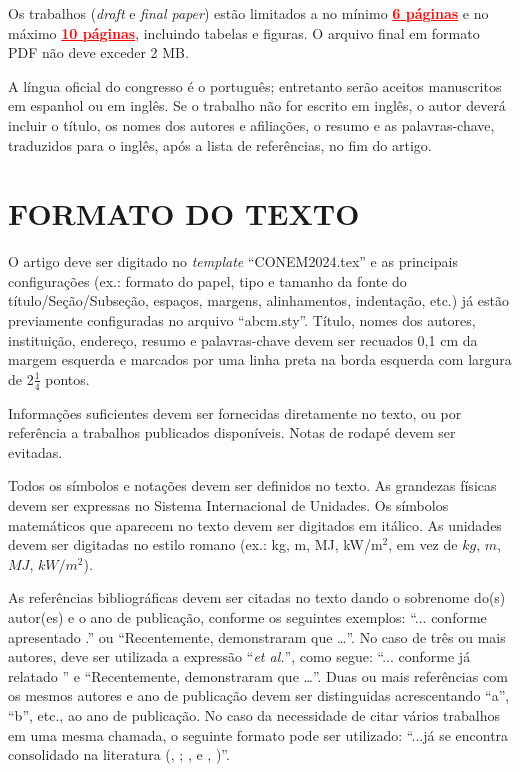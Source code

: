 \documentclass[10pt,fleqn,a4paper,twoside]{article}
\begin{document}
        Os trabalhos (\textit{draft} e \textit{final paper}) estão limitados a no mínimo \textcolor{red}{\underline{\textbf{6 páginas}}} e no máximo \textcolor{red}{\underline{\textbf{10 páginas}}}, incluindo tabelas e figuras. O arquivo final em formato PDF não deve exceder 2 MB.

        A língua oficial do congresso é o português; entretanto serão aceitos manuscritos em espanhol ou em inglês. Se o trabalho não for escrito em inglês, o autor deverá incluir o título, os nomes dos autores e afiliações, o resumo e as palavras-chave, traduzidos para o inglês, após a lista de referências, no fim do artigo.


    \section{FORMATO DO TEXTO}
        
        O artigo deve ser digitado no \textit{template} ``CONEM2024.tex'' e as principais configurações (ex.: formato do papel, tipo e tamanho da fonte do título/Seção/Subseção, espaços, margens, alinhamentos, indentação, etc.) já estão previamente configuradas no arquivo ``abcm.sty''. Título, nomes dos autores, instituição, endereço, resumo e palavras-chave devem ser recuados 0,1 cm da margem esquerda e marcados por uma linha preta na borda esquerda com largura de 2$\frac{1}{4}$ pontos.
        
        Informações suficientes devem ser fornecidas diretamente no texto, ou por referência a trabalhos publicados disponíveis. Notas de rodapé devem ser evitadas. 
        
        Todos os símbolos e notações devem ser definidos no texto. As grandezas físicas devem ser expressas no Sistema Internacional de Unidades. Os símbolos matemáticos que aparecem no texto devem ser digitados em itálico. As unidades devem ser digitadas no estilo romano (ex.: kg, m, MJ, kW/m$^2$, em vez de $kg$, $m$, $MJ$, $kW/m^2$).
        
        As referências bibliográficas devem ser citadas no texto dando o sobrenome do(s) autor(es) e o ano de publicação, conforme os seguintes exemplos: ``... conforme apresentado \citep{MinwooShamim13}.'' ou ``Recentemente, \citet{MinwooShamim13} demonstraram que …''. No caso de três ou mais autores, deve ser utilizada a expressão ``\textit{et al.}'', como segue: ``... conforme já relatado \citep{Bordalo89}'' e ``Recentemente, \citet{Bordalo89} demonstraram que …''. Duas ou mais referências com os mesmos autores e ano de publicação devem ser distinguidas acrescentando ``a'', ``b'', etc., ao ano de publicação. No caso da necessidade de citar vários trabalhos em uma mesma chamada, o seguinte formato pode ser utilizado: ``...já se encontra consolidado na literatura (\citeauthor{Coimbra78}, \citeyear{Coimbra78}; \citeauthor{Clark86}, \citeyear{Clark86} e \citeauthor{Sparrow80},  \citeyear{Sparrow80})''.  
        
\end{document}
